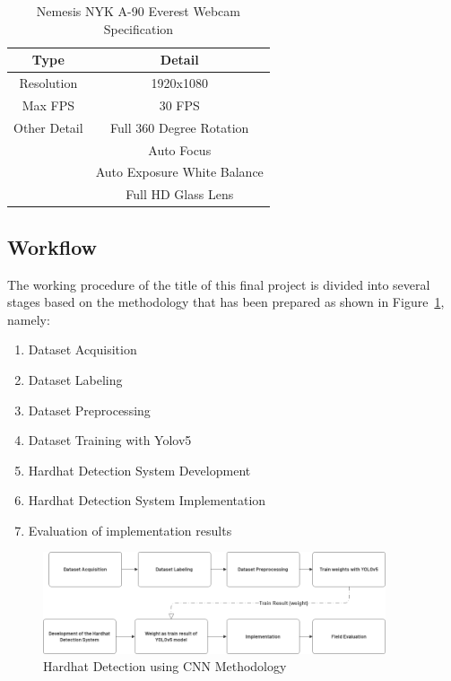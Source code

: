 \begin{table} [ht]
  \caption{Nemesis NYK A-90 Everest Webcam Specification}
  \label{tab:nyka90_webcam_spec}
  \centering
  \begin{tabular}{|c|c|}
    \hline
    \textbf{Type} & \textbf{Detail}  \\
    \hline
    Resolution         & 1920x1080 \\ 
    Max FPS            & 30 FPS  \\
    Other Detail       & Full 360 Degree Rotation \\
                        & Auto Focus \\
                        & Auto Exposure White Balance    \\
                      & Full HD Glass Lens    \\              
    \hline
  \end{tabular}
\end{table}

\subsection{Workflow}
\label{subsec:workflow}

\par The working procedure of the title of this final project is divided into several stages based on the methodology that has been prepared as shown in Figure~\ref{fig:hedec_method}, namely: 

\begin{enumerate}[nolistsep]  
  \item Dataset Acquisition
  \item Dataset Labeling 
  \item Dataset Preprocessing  
  \item Dataset Training with Yolov5  
  \item Hardhat Detection System Development
  \item Hardhat Detection System  Implementation 
  \item Evaluation of implementation results 
\end{enumerate}

\begin{figure} [ht]
  \centering
  \includegraphics[width=0.9\textwidth]{gambar/utilities/methodologi_hardhat.png}

  \caption{Hardhat Detection using CNN Methodology}
  \label{fig:hedec_method}
\end{figure}

